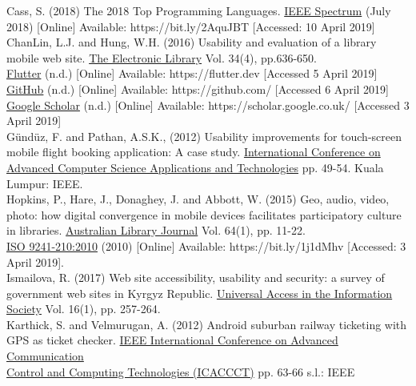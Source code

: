 \documentclass[version=last,fontsize=13pt]{scrartcl}
\begin{document}

Cass, S. (2018) The 2018 Top Programming Languages.  \underline{IEEE Spectrum} (July 2018) [Online] Available: https://bit.ly/2AquJBT [Accessed: 10 April 2019]\\

ChanLin, L.J. and Hung, W.H. (2016) Usability and evaluation of a library mobile web site. \underline{The Electronic Library} Vol. 34(4), pp.636-650.\\

\underline{Flutter} (n.d.) [Online] Available: https://flutter.dev [Accessed 5 April 2019]\\

\underline{GitHub} (n.d.) [Online] Available: https://github.com/ [Accessed 6 April 2019]\\

\underline{Google Scholar} (n.d.) [Online] Available: https://scholar.google.co.uk/ [Accessed 3 April 2019]\\

Gündüz, F. and Pathan, A.S.K., (2012) Usability improvements for touch-screen mobile flight booking application: A case study.  \underline{International Conference on Advanced } \underline{Computer Science Applications and Technologies}  pp. 49-54. Kuala Lumpur: IEEE.\\

Hopkins, P., Hare, J., Donaghey, J. and Abbott, W. (2015) Geo, audio, video, photo: how digital convergence in mobile devices facilitates participatory culture in libraries. \underline{Australian Library Journal} Vol. 64(1), pp. 11-22.\\

\underline{ISO 9241-210:2010} (2010) [Online] Available: https://bit.ly/1j1dMhv [Accessed: 3 April 2019].\\

Ismailova, R. (2017) Web site accessibility, usability and security: a survey of government web sites in Kyrgyz Republic. \underline{Universal Access in the Information Society} Vol. 16(1), pp. 257-264. \\

Karthick, S. and Velmurugan, A. (2012) Android suburban railway ticketing with GPS as ticket checker.  \underline{IEEE International Conference on Advanced Communication }\\ \underline{Control and Computing Technologies (ICACCCT)} pp. 63-66  s.l.: IEEE\\
\end{document}
